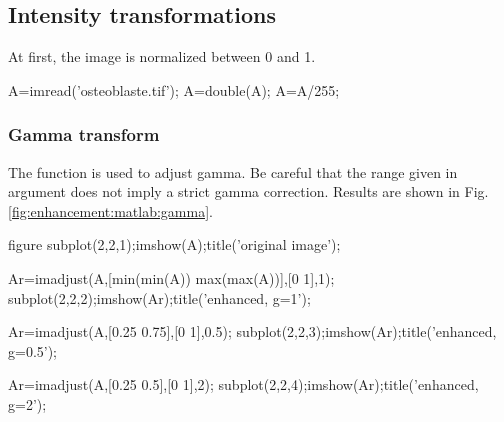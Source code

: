\def\QRCODE{TB_image_TUT.IMG.image_enhancement_matlabqrcode.png}
\def\QRPAGE{http://www.iptutorials.science/tree/master/TB_image/TUT.IMG.image_enhancement/matlab}

\subsection{Intensity transformations}
At first, the image is normalized between 0 and 1.
\begin{matlab}
A=imread('osteoblaste.tif');
A=double(A);
A=A/255; %
\end{matlab}

\subsubsection{Gamma transform}
The \matlabregistered{} function  is used to adjust gamma. Be careful that the range given in argument does not imply a strict gamma correction. Results are shown in Fig.\ref{fig:enhancement:matlab:gamma}.
\begin{matlab}
figure
subplot(2,2,1);imshow(A);title('original image');

Ar=imadjust(A,[min(min(A)) max(max(A))],[0 1],1);
subplot(2,2,2);imshow(Ar);title('enhanced, g=1');

Ar=imadjust(A,[0.25 0.75],[0 1],0.5);
subplot(2,2,3);imshow(Ar);title('enhanced, g=0.5');

Ar=imadjust(A,[0.25 0.5],[0 1],2);
subplot(2,2,4);imshow(Ar);title('enhanced, g=2');
\end{matlab}

